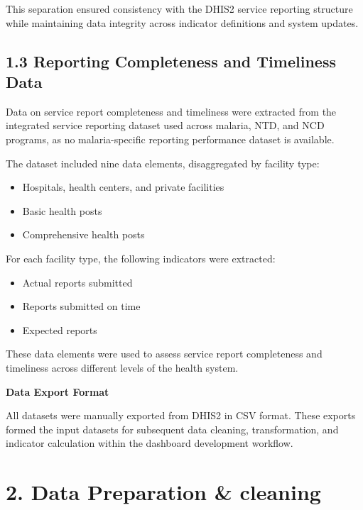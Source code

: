 \documentclass[
  letterpaper,
  DIV=11,
  numbers=noendperiod]{scrartcl}
\providecommand{\tightlist}{%
  \setlength{\itemsep}{0pt}\setlength{\parskip}{0pt}}
\begin{document}
This separation ensured consistency with the DHIS2 service reporting
structure while maintaining data integrity across indicator definitions
and system updates.

\subsection{1.3 Reporting Completeness and Timeliness
Data}\label{reporting-completeness-and-timeliness-data}

Data on service report completeness and timeliness were extracted from
the integrated service reporting dataset used across malaria, NTD, and
NCD programs, as no malaria-specific reporting performance dataset is
available.

The dataset included nine data elements, disaggregated by facility type:

\begin{itemize}
\tightlist
\item
  Hospitals, health centers, and private facilities\\
\item
  Basic health posts\\
\item
  Comprehensive health posts
\end{itemize}

For each facility type, the following indicators were extracted:

\begin{itemize}
\tightlist
\item
  Actual reports submitted\\
\item
  Reports submitted on time\\
\item
  Expected reports
\end{itemize}

These data elements were used to assess service report completeness and
timeliness across different levels of the health system.

\textbf{Data Export Format}

All datasets were manually exported from DHIS2 in CSV format. These
exports formed the input datasets for subsequent data cleaning,
transformation, and indicator calculation within the dashboard
development workflow.

\section{2. Data Preparation \&
cleaning}\label{data-preparation-cleaning}
\end{document}
